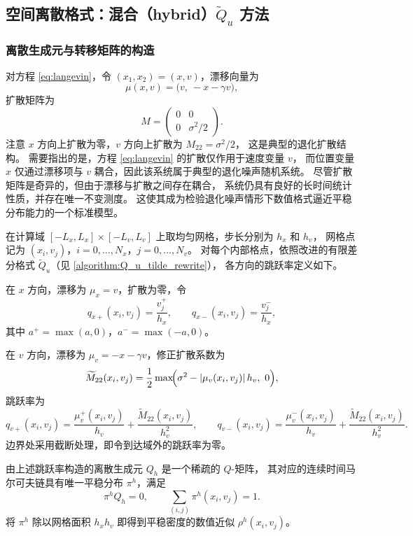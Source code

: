 	\subsection{空间离散格式：混合（hybrid）$\widetilde{Q}_u$ 方法}
	
	\subsubsection{离散生成元与转移矩阵的构造}
	
	对方程 \eqref{eq:langevin}，令 $(x_1, x_2) = (x, v)$，漂移向量为
	\[
	\mu(x, v) = \bigl(v,\ -x - \gamma v\bigr),
	\]
	扩散矩阵为
	\[
	M = \begin{pmatrix} 0 & 0 \\ 0 & \sigma^2/2 \end{pmatrix}.
	\]
	注意 $x$ 方向上扩散为零，$v$ 方向上扩散为 $M_{22} = \sigma^2/2$，
	这是典型的退化扩散结构。
	需要指出的是，方程 \eqref{eq:langevin} 的扩散仅作用于速度变量 $v$，
	而位置变量 $x$ 仅通过漂移项与 $v$ 耦合，因此该系统属于典型的退化噪声随机系统。
	尽管扩散矩阵是奇异的，但由于漂移与扩散之间存在耦合，
	系统仍具有良好的长时间统计性质，并存在唯一不变测度。
	这使其成为检验退化噪声情形下数值格式逼近平稳分布能力的一个标准模型。
	
	在计算域 $[-L_x, L_x]\times[-L_v, L_v]$ 上取均匀网格，步长分别为 $h_x$ 和 $h_v$，
	网格点记为 $(x_i, v_j)$，$i = 0, \dots, N_x$，$j = 0, \dots, N_v$。
	对每个内部格点，依照改进的有限差分格式 $\widetilde{Q}_u$（见 \eqref{algorithm:Q_u_tilde_rewrite}），
	各方向的跳跃率定义如下。
	
	在 $x$ 方向，漂移为 $\mu_x = v$，扩散为零，令
	\[
	q_{x+}(x_i, v_j) = \frac{v_j^+}{h_x},\qquad
	q_{x-}(x_i, v_j) = \frac{v_j^-}{h_x},
	\]
	其中 $a^+ = \max(a, 0)$，$a^- = \max(-a, 0)$。
	
	在 $v$ 方向，漂移为 $\mu_v = -x - \gamma v$，修正扩散系数为
	\[
	\widetilde{M}_{22}(x_i, v_j)
	= \frac{1}{2}\max\!\Bigl(\sigma^2 - \lvert\mu_v(x_i,v_j)\rvert\,h_v,\ 0\Bigr),
	\]
	跳跃率为
	\[
	q_{v+}(x_i, v_j)
	= \frac{\mu_v^+(x_i,v_j)}{h_v} + \frac{\widetilde{M}_{22}(x_i,v_j)}{h_v^2},\qquad
	q_{v-}(x_i, v_j)
	= \frac{\mu_v^-(x_i,v_j)}{h_v} + \frac{\widetilde{M}_{22}(x_i,v_j)}{h_v^2}.
	\]
	边界处采用截断处理，即令到达域外的跳跃率为零。
	
	由上述跳跃率构造的离散生成元 $Q_h$ 是一个稀疏的 $Q$-矩阵，
	其对应的连续时间马尔可夫链具有唯一平稳分布 $\pi^h$，满足
	\[
	\pi^h Q_h = 0,\qquad \sum_{(i,j)} \pi^h(x_i, v_j) = 1.
	\]
	将 $\pi^h$ 除以网格面积 $h_x h_v$ 即得到平稳密度的数值近似 $\rho^h(x_i, v_j)$。
	
